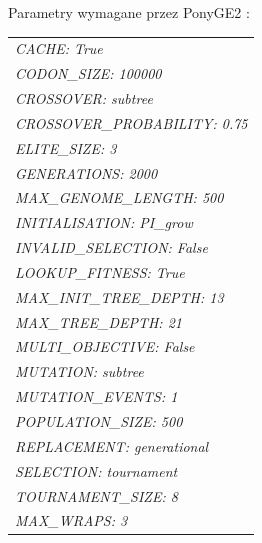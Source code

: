 Parametry wymagane przez PonyGE2 \cite{PonyGE2-wiki}:
\begin{center}
\begin{tabular}{l}
\textit{CACHE:                         True} \\
\textit{CODON\_SIZE:                   100000} \\
\textit{CROSSOVER:                     subtree} \\
\textit{CROSSOVER\_PROBABILITY:         0.75} \\
\textit{ELITE\_SIZE:                   3} \\
\textit{GENERATIONS:                   2000} \\
\textit{MAX\_GENOME\_LENGTH:           500} \\
\textit{INITIALISATION:                 PI\_grow} \\
\textit{INVALID\_SELECTION:              False} \\
\textit{LOOKUP\_FITNESS:                 True} \\
\textit{MAX\_INIT\_TREE\_DEPTH:            13} \\
\textit{MAX\_TREE\_DEPTH:                 21} \\
\textit{MULTI\_OBJECTIVE:                False} \\
\textit{MUTATION:                       subtree} \\
\textit{MUTATION\_EVENTS:                1} \\
\textit{POPULATION\_SIZE:                500} \\
\textit{REPLACEMENT:                    generational} \\
\textit{SELECTION:                      tournament} \\
\textit{TOURNAMENT\_SIZE:                8} \\
\textit{MAX\_WRAPS:                      3}
\end{tabular}
\end{center}

